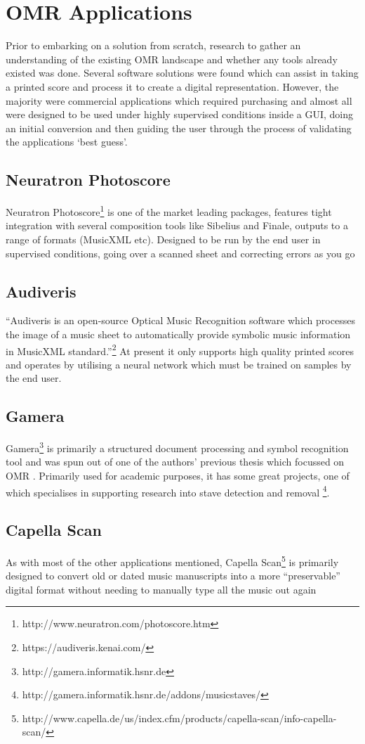 \section{OMR Applications}

Prior to embarking on a solution from scratch, research to gather an understanding of the existing OMR landscape and whether any tools already existed was done. Several software solutions were found which can assist in taking a printed score and process it to create a digital representation. However, the majority were commercial applications which required purchasing and almost all were designed to be used under highly supervised conditions inside a \acrfull{GUI}, doing an initial conversion and then guiding the user through the process of validating the applications `best guess'.

\subsection{Neuratron Photoscore}
Neuratron Photoscore\footnote{http://www.neuratron.com/photoscore.htm} is one of the market leading packages, features tight integration with several composition tools like Sibelius and Finale, outputs to a range of formats (MusicXML etc). Designed to be run by the end user in supervised conditions, going over a scanned sheet and correcting errors as you go

\subsection{Audiveris}
``Audiveris is an open-source Optical Music Recognition software which processes the image of a music sheet to automatically provide symbolic music information in MusicXML standard.''\footnote{https://audiveris.kenai.com/}
\newline
At present it only supports high quality printed scores and operates by utilising a neural network which must be trained on samples by the end user.

\subsection{Gamera}
Gamera\footnote{http://gamera.informatik.hsnr.de} is primarily a structured document processing and symbol recognition tool \parencite{macmillan2002gamera} and was spun out of one of the authors' previous thesis which focussed on OMR \parencite{fujinaga1996adaptive}. Primarily used for academic purposes, it has some great projects, one of which specialises in supporting research into stave detection and removal \footnote{http://gamera.informatik.hsnr.de/addons/musicstaves/}.

\subsection{Capella Scan}
As with most of the other applications mentioned, Capella Scan\footnote{http://www.capella.de/us/index.cfm/products/capella-scan/info-capella-scan/} is primarily designed to convert old or dated music manuscripts into a more ``preservable'' digital format without needing to manually type all the music out again


